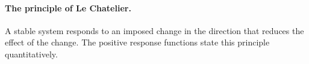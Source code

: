 \paragraph{The principle of Le Chatelier.}
A stable system responds to an imposed change in the direction that reduces
the effect of the change. The positive response functions state this
principle quantitatively.
